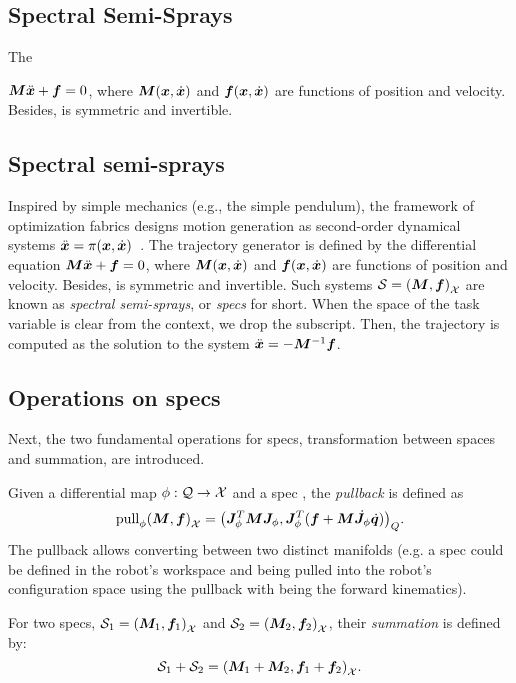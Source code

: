 \subsection{Spectral Semi-Sprays} %
\label{sub:spectral_semi_sprays}

The 




$\bm{M}\ddot{\bm{x}} + \bm{f} = 0$, where $\bm{M}(\bm{x},\dot{\bm{x}})$ and $\bm{f}(\bm{x},\dot{\bm{x}})$
are functions of position and velocity. Besides, \M{} is
symmetric and invertible. 

\subsection{Spectral semi-sprays}%
\label{sub:spectral_semi_sprays}

Inspired by simple mechanics (e.g., the simple pendulum),
the framework of optimization fabrics designs motion
generation as second-order dynamical systems $\ddot{\bm{x}} =
\pi(\bm{x},\dot{\bm{x}})$~\cite{Cheng2020,Ratliff2020}. The
trajectory generator is defined by the differential equation
$\bm{M}\ddot{\bm{x}} + \bm{f} = 0$, where $\bm{M}(\bm{x},\dot{\bm{x}})$ and $\bm{f}(\bm{x},\dot{\bm{x}})$
are functions of position and velocity. Besides, \M{} is
symmetric and invertible. Such systems $\mathcal{S} = \left(\bm{M},\bm{f}\right)_{\mathcal{X}}$ are
known as \textit{spectral semi-sprays}, or \textit{specs}
for short.  When the space of the task variable is clear
from the context, we drop the subscript.  Then, the
trajectory is computed as the solution to the system
$\ddot{\bm{x}}=-\bm{M}^{-1}\bm{f}$.

\subsection{Operations on specs}%
\label{sub:operations_on_specs}
Next, the two fundamental operations for specs, transformation between spaces and
summation, are introduced.

Given a differential map $\phi: \mathcal{Q}\rightarrow\mathcal{X}$ and a spec \spec{}, the \textit{pullback}
is defined as 
\begin{equation}
  \textrm{pull}_{\phi}{\left(\bm{M},\bm{f}\right)_{\mathcal{X}}} = {\left(\bm{J}^T_{\phi}\bm{M}\bm{J}_{\phi}, \bm{J}^T_{\phi}(\bm{f}+\bm{M}\dot{\bm{J}}_{\phi}\dot{\bm{q}})\right)}_{Q}.
\end{equation}
The pullback allows converting between two distinct manifolds (e.g. a spec could be 
defined in the robot's workspace and being pulled into the robot's configuration space using
the pullback with \map{} being the forward kinematics).

For two specs, $\mathcal{S}_1 = {\left(\bm{M}_1,\bm{f}_1\right)}_{\mathcal{X}}$ and 
$\mathcal{S}_2 = {\left(\bm{M}_2,\bm{f}_2\right)}_{\mathcal{X}}$, their \textit{summation} is defined by:
\begin{equation}
  \mathcal{S}_1 + \mathcal{S}_2 = {\left(\bm{M}_1 + \bm{M}_2, \bm{f}_1 + \bm{f}_2\right)}_{\mathcal{X}}.
\end{equation}

